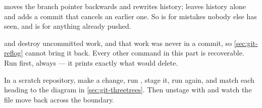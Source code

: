 \begin{intuition}
	 moves the branch pointer backwards and rewrites history;
	 leaves history alone and adds a commit that cancels an earlier
	one. So  is for mistakes nobody else has seen, and  is
	for anything already pushed.
\end{intuition}

\begin{note}
	 and  destroy uncommitted work, and
	that work was never in a commit, so \autoref{sec:git-reflog} cannot bring it
	back. Every other command in this part is recoverable. Run 
	first, always --- it prints exactly what  would delete.
\end{note}

\begin{eg}
\end{eg}

\begin{tryit}
	In a scratch repository, make a change, run , stage it, run
	 again, and match each heading to the diagram in
	\autoref{sec:git-threetrees}. Then unstage with  and
	watch the file move back across the boundary.
\end{tryit}

